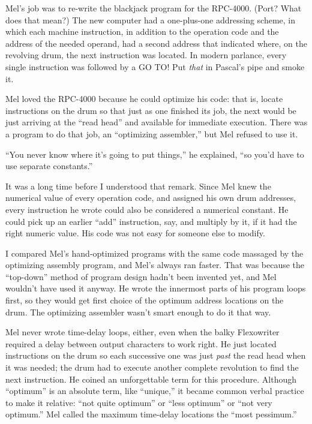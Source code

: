 \documentclass[12pt]{article}
\begin{document}
\bigskip
\noindent
Mel's job was to re-write the blackjack program for the
RPC-4000. (Port? What does that mean?) The new computer
had a one-plus-one addressing scheme, in which each machine
instruction, in addition to the operation code and the
address of the needed operand, had a second address that
indicated where, on the revolving drum, the next instruction
was located. In modern parlance, every single instruction
was followed by a GO TO! Put {\it that} in Pascal's pipe and
smoke it.

\bigskip
\noindent
Mel loved the RPC-4000 because he could optimize his code:
that is, locate instructions on the drum so that just as one
finished its job, the next would be just arriving at the
``read head'' and available for immediate execution. There
was a program to do that job, an ``optimizing assembler,'' but
Mel refused to use it.

\bigskip
\noindent
``You never know where it's going to put things,'' he
explained, ``so you'd have to use separate constants.''

\bigskip
\noindent
It was a long time before I understood that remark. Since
Mel knew the numerical value of every operation code, and
assigned his own drum addresses, every instruction he wrote
could also be considered a numerical constant. He could
pick up an earlier ``add'' instruction, say, and multiply by
it, if it had the right numeric value. His code was not
easy for someone else to modify.

\bigskip
\noindent
I compared Mel's hand-optimized programs with the same code
massaged by the optimizing assembly program, and Mel's
always ran faster. That was because the ``top-down'' method
of program design hadn't been invented yet, and Mel wouldn't
have used it anyway. He wrote the innermost parts of his
program loops first, so they would get first choice of the
optimum address locations on the drum. The optimizing
assembler wasn't smart enough to do it that way.

\bigskip
\noindent
Mel never wrote time-delay loops, either, even when the
balky Flexowriter required a delay between output characters
to work right. He just located instructions on the drum so
each successive one was just {\it past} the read head when it
was needed; the drum had to execute another complete
revolution to find the next instruction. He coined an
unforgettable term for this procedure. Although ``optimum''
is an absolute term, like ``unique,'' it became common verbal
practice to make it relative: ``not quite optimum'' or ``less
optimum'' or ``not very optimum.'' Mel called the maximum
time-delay locations the ``most pessimum.''
\end{document}
